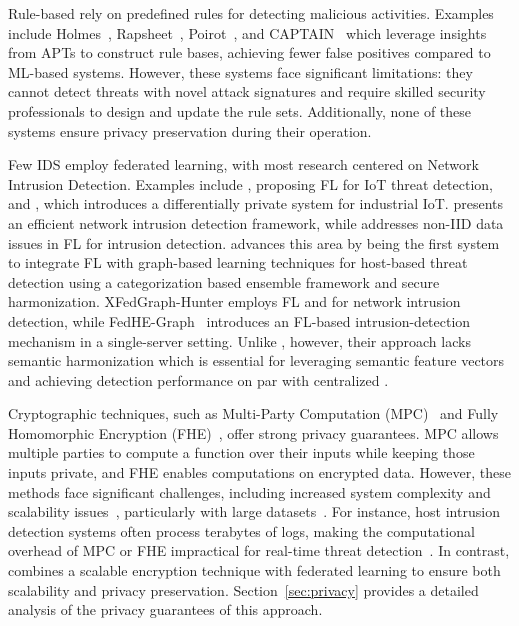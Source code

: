  Rule-based \pids rely on predefined rules for detecting malicious activities. Examples include Holmes~\cite{holmes2019}, Rapsheet~\cite{rapsheet2020}, Poirot~\cite{poirot2019}, and CAPTAIN~\cite{wang2024incorporating} which leverage insights from APTs to construct rule bases, achieving fewer false positives compared to ML-based systems. However, these systems face significant limitations: they cannot detect threats with novel attack signatures and require skilled security professionals to design and update the rule sets. Additionally, none of these systems ensure privacy preservation during their operation.

 Few IDS employ federated learning, with most research centered on Network Intrusion Detection. Examples include \cite{man2021intelligent}, proposing FL for IoT threat detection, and \cite{friha20232df}, which introduces a differentially private system for industrial IoT. \cite{li2023efficient} presents an efficient network intrusion detection framework, while \cite{guo2023new} addresses non-IID data issues in FL for intrusion detection. \Sys advances this area by being the first system to integrate FL with graph-based learning techniques for host-based threat detection using a categorization based \gnnshort ensemble framework and secure \wordvec harmonization. XFedGraph-Hunter \cite{son2023xfedgraph} employs FL and \gnnshort for network intrusion detection, while FedHE-Graph~\cite{mansour2024fedhe} introduces an FL-based intrusion-detection mechanism in a single-server setting. Unlike \Sys, however, their approach lacks semantic harmonization which is essential for leveraging semantic feature vectors and achieving detection performance on par with centralized \pids.

 Cryptographic techniques, such as Multi-Party Computation (MPC)~\cite{cramer2015secure} and Fully Homomorphic Encryption (FHE)~\cite{armknecht2015guide}, offer strong privacy guarantees. MPC allows multiple parties to compute a function over their inputs while keeping those inputs private, and FHE enables computations on encrypted data. However, these methods face significant challenges, including increased system complexity and scalability issues~\cite{du2001secure, gentry2009fully, asharov2013more}, particularly with large datasets~\cite{menezes2018handbook}. For instance, host intrusion detection systems often process terabytes of logs, making the computational overhead of MPC or FHE impractical for real-time threat detection~\cite{loggc}. In contrast, \Sys combines a scalable encryption technique with federated learning to ensure both scalability and privacy preservation. Section~\ref{sec:privacy} provides a detailed analysis of the privacy guarantees of this approach.

